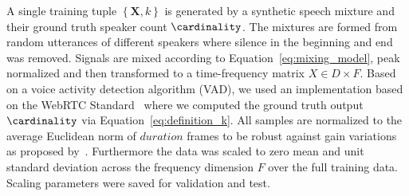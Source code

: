 \par
A single training tuple \( \left\{\mathbf{X}, k\right\} \) is generated by a synthetic speech mixture and their ground truth speaker count \(\cardinality \).
The mixtures are formed from random utterances of different speakers where silence in the beginning and end was removed.
Signals are mixed according to Equation~\ref{eq:mixing_model}, peak normalized and then transformed to a time-frequency matrix \(X \in D \times F\).
Based on a voice activity detection algorithm (VAD), we used an implementation based on the WebRTC Standard~\cite{webrtc} where we computed the ground truth output \(\cardinality \) via  Equation~\ref{eq:definition_k}.
All samples are normalized to the average Euclidean norm of \(duration\) frames to be robust against gain variations as proposed by~\cite{Uhlich15}.
Furthermore the data was scaled to zero mean and unit standard deviation across the frequency dimension \(F\) over the full training data.
Scaling parameters were saved for validation and test.

%

